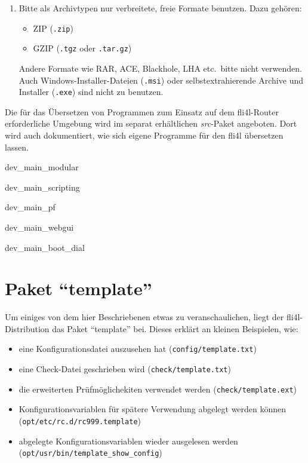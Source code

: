 \begin{enumerate}
    \item Bitte als Archivtypen nur verbreitete, freie Formate benutzen. Dazu
    gehören:
    \begin{itemize}
      \item ZIP  (\texttt{.zip})
      \item GZIP (\texttt{.tgz} oder \texttt{.tar.gz})
    \end{itemize}
    Andere Formate wie RAR, ACE, Blackhole, LHA etc.\ bitte nicht verwenden.
    Auch Windows-Installer-Dateien (\texttt{.msi}) oder selbstextrahierende Archive und
    Installer (\texttt{.exe}) sind nicht zu benutzen.
  \end{enumerate}


Die für das Übersetzen von Programmen zum Einsatz auf dem fli4l-Router
erforderliche Umgebung wird im separat erhältlichen \emph{src}-Paket angeboten.
Dort wird auch dokumentiert, wie sich eigene Programme für den fli4l übersetzen
lassen.

 {dev_main_modular}

 {dev_main_scripting}

 {dev_main_pf}

 {dev_main_webgui}

 {dev_main_boot_dial}

\section{Paket "`template"'}

Um einiges von dem hier Beschriebenen etwas zu veranschaulichen, liegt der
fli4l-Distribution das Paket "`template"' bei. Dieses erklärt an kleinen
Beispielen, wie:

\begin{itemize}
\item eine Konfigurationsdatei auszusehen hat (\texttt{config/template.txt})
\item eine Check-Datei geschrieben wird (\texttt{check/template.txt})
\item die erweiterten Prüfmöglichekiten verwendet werden (\texttt{check/template.ext})
\item Konfigurationsvariablen für spätere Verwendung abgelegt werden
  können \\(\texttt{opt/etc/rc.d/rc999.template})
\item abgelegte Konfigurationsvariablen wieder ausgelesen werden \\(\texttt{opt/usr/bin/template\_show\_config})
\end{itemize}



